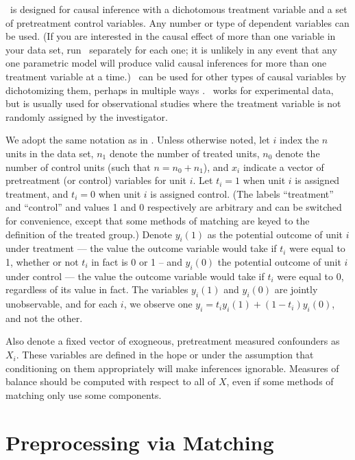 
\MatchIt\ is designed for causal inference with a dichotomous treatment
variable and a set of pretreatment control variables.  Any number or
type of dependent variables can be used.  (If you are interested in
the causal effect of more than one variable in your data set, run
\MatchIt\ separately for each one; it is unlikely in any event that
any one parametric model will produce valid causal inferences for more
than one treatment variable at a time.)  \MatchIt\ can be used for
other types of causal variables by dichotomizing them, perhaps in
multiple ways \citep[see also][]{ImaDyk04}.  \MatchIt\ works for
experimental data, but is usually used for observational studies where
the treatment variable is not randomly assigned by the investigator.

We adopt the same notation as in \citet*{HoImaKin07}.  Unless
otherwise noted, let $i$ index the $n$ units in the data set, $n_1$
denote the number of treated units, $n_0$ denote the number of control
units (such that $n=n_0+n_1$), and $x_i$ indicate a vector of
pretreatment (or control) variables for unit $i$.  Let $t_i=1$ when
unit $i$ is assigned treatment, and $t_i=0$ when unit $i$ is assigned
control.  (The labels ``treatment'' and ``control'' and values 1 and 0
respectively are arbitrary and can be switched for convenience, except
that some methods of matching are keyed to the definition of the
treated group.)  Denote $y_i(1)$ as the potential outcome of unit $i$
under treatment --- the value the outcome variable would take if $t_i$
were equal to 1, whether or not $t_i$ in fact is 0 or 1 -- and
$y_i(0)$ the potential outcome of unit $i$ under control --- the value
the outcome variable would take if $t_i$ were equal to 0, regardless
of its value in fact.  The variables $y_i(1)$ and $y_i(0)$ are jointly
unobservable, and for each $i$, we observe one
$y_i=t_iy_i(1)+(1-t_i)y_i(0)$, and not the other.  

Also denote a fixed vector of exogneous, pretreatment measured
confounders as $X_i$.  These variables are defined in the hope or
under the assumption that conditioning on them appropriately will make
inferences ignorable.  Measures of balance should be computed with
respect to all of $X$, even if some methods of matching only use some
components.

\section{Preprocessing via Matching}

